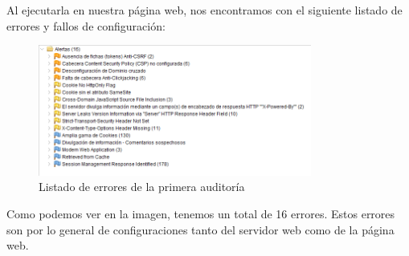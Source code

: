 \documentclass{report}
\begin{document}
            Al ejecutarla en nuestra página web, nos encontramos con el siguiente listado de errores y fallos de configuración:
            \begin{figure}[H]
                \centering
                \includegraphics[width=0.8\textwidth]{./img/audit1/zap1.png}
                \caption{Listado de errores de la primera auditoría}
            \end{figure}
            Como podemos ver en la imagen, tenemos un total de 16 errores.
            Estos errores son por lo general de configuraciones tanto del servidor web como de la página web.

        \clearpage
\end{document}
